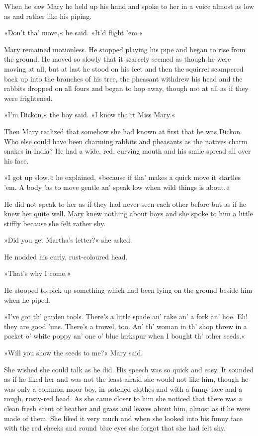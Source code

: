 When he saw Mary he held up his hand and spoke to her in a voice almost as low as and rather like his piping.

»Don't tha' move,« he said. »It'd flight 'em.«

Mary remained motionless. He stopped playing his pipe and began to rise from the ground. He moved so slowly that it scarcely seemed as though he were moving at all, but at last he stood on his feet and then the squirrel scampered back up into the branches of his tree, the pheasant withdrew his head and the rabbits dropped on all fours and began to hop away, though not at all as if they were frightened.

»I'm Dickon,« the boy said. »I know tha'rt Miss Mary.«

Then Mary realized that somehow she had known at first that he was Dickon. Who else could have been charming rabbits and pheasants as the natives charm snakes in India? He had a wide, red, curving mouth and his smile spread all over his face.

»I got up slow,« he explained, »because if tha' makes a quick move it startles 'em. A body 'as to move gentle an' speak low when wild things is about.«

He did not speak to her as if they had never seen each other before but as if he knew her quite well. Mary knew nothing about boys and she spoke to him a little stiffly because she felt rather shy.

»Did you get Martha's letter?« she asked.

He nodded his curly, rust-coloured head.

»That's why I come.«

He stooped to pick up something which had been lying on the ground beside him when he piped.

»I've got th' garden tools. There's a little spade an' rake an' a fork an' hoe. Eh! they are good 'uns. There's a trowel, too. An' th' woman in th' shop threw in a packet o' white poppy an' one o' blue larkspur when I bought th' other seeds.«

»Will you show the seeds to me?« Mary said.

She wished she could talk as he did. His speech was so quick and easy. It sounded as if he liked her and was not the least afraid she would not like him, though he was only a common moor boy, in patched clothes and with a funny face and a rough, rusty-red head. As she came closer to him she noticed that there was a clean fresh scent of heather and grass and leaves about him, almost as if he were made of them. She liked it very much and when she looked into his funny face with the red cheeks and round blue eyes she forgot that she had felt shy.

